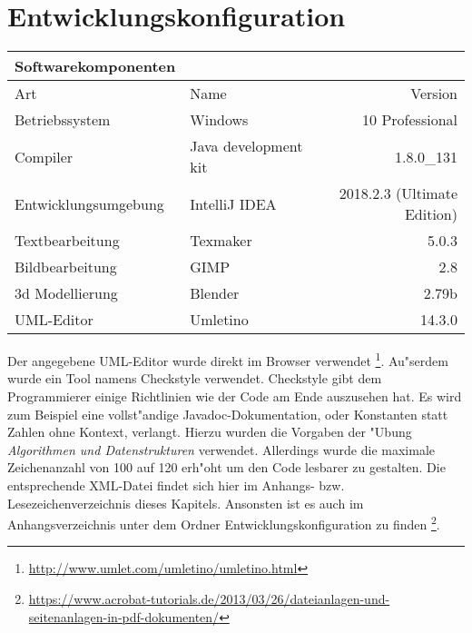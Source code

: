 \section{Entwicklungskonfiguration}
\label{sec:entwicklungskonfiguration}
\begin{table}[h!]
	\begin{tabular}{llr} 
	\toprule
	Softwarekomponenten\\  
	\midrule 
	Art & Name & Version\\ 
	\midrule 
	Betriebssystem & Windows & 10 Professional\\ 
	Compiler & Java development kit & 1.8.0\_131\\
  Entwicklungsumgebung & IntelliJ IDEA & 2018.2.3 (Ultimate Edition)\\
  Textbearbeitung & Texmaker & 5.0.3\\
  Bildbearbeitung & GIMP & 2.8\\
  3d Modellierung & Blender & 2.79b\\
  UML-Editor & Umletino & 14.3.0\\
	\bottomrule
	\end{tabular}
	\label{tab:ablaufbedingungen}
\end{table}
Der angegebene UML-Editor wurde direkt im Browser verwendet 
\footnote{\url{http://www.umlet.com/umletino/umletino.html}}. 
Au"serdem wurde ein Tool namens Checkstyle verwendet. Checkstyle gibt dem Programmierer einige 
Richtlinien wie der Code am Ende auszusehen hat. Es wird zum Beispiel eine vollst"andige Javadoc-Dokumentation, oder Konstanten statt Zahlen ohne Kontext, verlangt. Hierzu wurden die Vorgaben der "Ubung 
\emph{Algorithmen und Datenstrukturen} verwendet. Allerdings wurde die maximale Zeichenanzahl von 100 auf 120 erh"oht um den Code lesbarer zu gestalten. Die entsprechende XML-Datei findet sich hier im Anhangs- bzw. Lesezeichenverzeichnis dieses Kapitels. Ansonsten ist es auch im Anhangsverzeichnis unter dem Ordner \glqq Entwicklungskonfiguration\grqq {} zu finden
\footnote{\url{https://www.acrobat-tutorials.de/2013/03/26/dateianlagen-und-seitenanlagen-in-pdf-dokumenten/}}.

